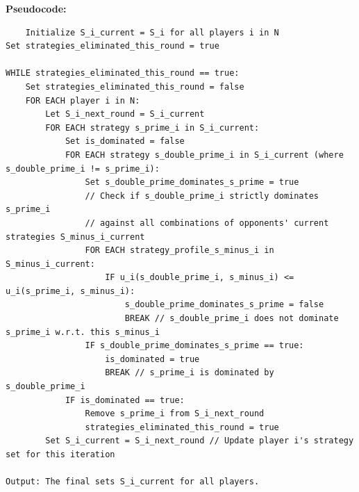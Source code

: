 \documentclass[../Main.tex]{subfiles}
\begin{document}
\textbf{Pseudocode:}
\begin{verbatim}
    Initialize S_i_current = S_i for all players i in N
Set strategies_eliminated_this_round = true

WHILE strategies_eliminated_this_round == true:
    Set strategies_eliminated_this_round = false
    FOR EACH player i in N:
        Let S_i_next_round = S_i_current
        FOR EACH strategy s_prime_i in S_i_current:
            Set is_dominated = false
            FOR EACH strategy s_double_prime_i in S_i_current (where s_double_prime_i != s_prime_i):
                Set s_double_prime_dominates_s_prime = true
                // Check if s_double_prime_i strictly dominates s_prime_i
                // against all combinations of opponents' current strategies S_minus_i_current
                FOR EACH strategy_profile_s_minus_i in S_minus_i_current: 
                    IF u_i(s_double_prime_i, s_minus_i) <= u_i(s_prime_i, s_minus_i):
                        s_double_prime_dominates_s_prime = false
                        BREAK // s_double_prime_i does not dominate s_prime_i w.r.t. this s_minus_i
                IF s_double_prime_dominates_s_prime == true:
                    is_dominated = true
                    BREAK // s_prime_i is dominated by s_double_prime_i
            IF is_dominated == true:
                Remove s_prime_i from S_i_next_round
                strategies_eliminated_this_round = true
        Set S_i_current = S_i_next_round // Update player i's strategy set for this iteration

Output: The final sets S_i_current for all players.
\end{verbatim}
\end{document}
